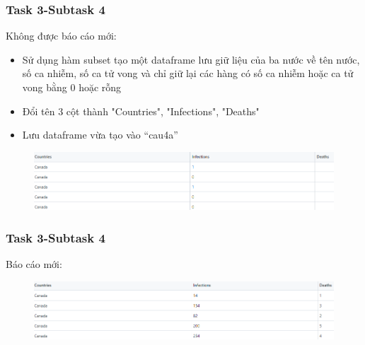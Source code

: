 \documentclass[english,10pt,table]{beamer}
\begin{document}
\frame
{
    \frametitle{Task 3-Subtask 4}
    \begin{block}{Không được báo cáo mới:}
    \begin{itemize}
	\item Sử dụng hàm subset tạo một dataframe lưu giữ liệu của ba nước về tên nước, số ca nhiễm, số ca tử vong và chỉ giữ lại các hàng có số ca nhiễm hoặc ca tử vong bằng 0 hoặc rỗng
	\item Đổi tên 3 cột thành "Countries", "Infections", "Deaths"
	\item Lưu dataframe vừa tạo vào “cau4a”
			    \end{itemize}
    \begin{figure}[H]
		\centering
		\includegraphics[scale=0.4]{images/3.4.1.png}
		\end{figure}
    \end{block}
}
\frame
{
    \frametitle{Task 3-Subtask 4}
    \begin{block}{Báo cáo mới:}
    \begin{figure}[H]
		\centering
		\includegraphics[scale=0.4]{images/3.4.2.png}
	\end{figure}
    \end{block}
}
\frame
\end{document}
